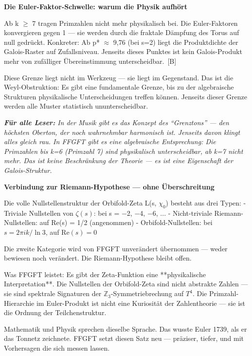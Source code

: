 \documentclass[11pt,oneside]{book}
\newcommand{\status}[1]{\penalty10000\,{\scriptsize\textcolor{gray!60}{[#1]}}}
\newenvironment{laierspur}{%
  \par\vspace{4pt}%
  \noindent\small\itshape\color{blue!60!black}%
  \textbf{Für alle Leser:}\enspace\ignorespaces}{%
  \par\vspace{4pt}\normalsize\normalfont\normalcolor}
\begin{document}
\textbf{Die Euler-Faktor-Schwelle: warum die Physik aufhört}


Ab k $\geq$ 7 tragen Primzahlen nicht mehr physikalisch bei. Die Euler-Faktoren
konvergieren gegen 1 — sie werden durch die fraktale Dämpfung des Torus
auf null gedrückt. Konkreter: Ab p* $\approx$ 9,76 (bei s=2) liegt die Produktdichte
der Galois-Raster auf Zufallsniveau. Jenseits dieses Punktes ist kein
Galois-Produkt mehr von zufälliger Übereinstimmung unterscheidbar. \status{B}


Diese Grenze liegt nicht im Werkzeug — sie liegt im Gegenstand. Das ist
die Weyl-Obstruktion: Es gibt eine fundamentale Grenze, bis zu der
algebraische Strukturen physikalische Unterscheidungen treffen können.
Jenseits dieser Grenze werden alle Muster statistisch ununterscheidbar.


\begin{laierspur}
In der Musik gibt es das Konzept des \enquote{Grenztons} — den
höchsten Oberton, der noch wahrnehmbar harmonisch ist. Jenseits
davon klingt alles gleich rau. In FFGFT gibt es eine algebraische
Entsprechung: Die Primzahlen bis k=6 (Primzahl 7) sind physikalisch
unterscheidbar, ab k=7 nicht mehr. Das ist keine Beschränkung der
Theorie — es ist eine Eigenschaft der Galois-Struktur.
\end{laierspur}

\textbf{Verbindung zur Riemann-Hypothese — ohne Überschreitung}


Die volle Nullstellenstruktur der Orbifold-Zeta L(s, $\chi_0$) besteht aus
drei Typen:
- Triviale Nullstellen von $\zeta(s)$: bei s = $-$2, $-$4, $-$6, ...
- Nicht-triviale Riemann-Nullstellen: auf Re(s) = 1/2 (angenommen)
- Orbifold-Nullstellen: bei $s = 2\pi i k/\ln 3$, auf $\mathrm{Re}(s) = 0$


Die zweite Kategorie wird von FFGFT unverändert übernommen — weder
bewiesen noch verändert. Die Riemann-Hypothese bleibt offen.


Was FFGFT leistet: Es gibt der Zeta-Funktion eine **physikalische
Interpretation**. Die Nullstellen der Orbifold-Zeta sind nicht abstrakte
Zahlen — sie sind spektrale Signaturen der $\mathbb{Z}_3$-Symmetriebrechung auf $T^4$.
Die Primzahl-Hierarchie im Euler-Produkt ist nicht eine Kuriosität der
Zahlentheorie — sie ist die Ordnung der Teilchenstruktur.


Mathematik und Physik sprechen dieselbe Sprache. Das wusste Euler 1739,
als er das Tonnetz zeichnete. FFGFT setzt diesen Satz neu — präziser,
tiefer, und mit Vorhersagen die sich messen lassen.
\end{document}
